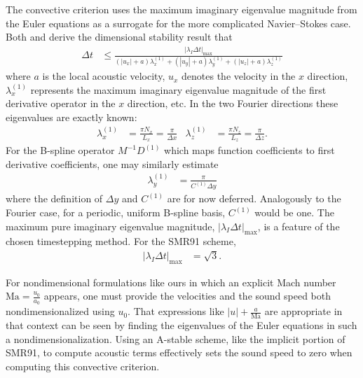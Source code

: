 \documentclass[letterpaper,11pt,nointlimits,reqno,draft]{amsbook}
\begin{document}
The convective criterion uses the maximum imaginary eigenvalue magnitude from
the Euler equations as a surrogate for the more complicated Navier--Stokes
case.  Both \citet[equation~2.39]{Kwok2002} and
\citet[equations~4.20--21]{Guarini1998} derive the dimensional stability result
that
\begin{align}\label{eq:convectivestability}
  \Delta{}t &\leq
  \frac{
    \left|\lambda_{I}\Delta{}t\right|_{\max}
  }{
      \left(\left|u_{x}\right| + a\right) \lambda^{(1)}_x
    + \left(\left|u_{y}\right| + a\right) \lambda^{(1)}_y
    + \left(\left|u_{z}\right| + a\right) \lambda^{(1)}_z
  }
\end{align}
where $a$ is the local acoustic velocity, $u_{x}$ denotes the velocity in the
$x$ direction, $\lambda^{(1)}_x$ represents the maximum imaginary eigenvalue
magnitude of the first derivative operator in the $x$ direction, etc.  In the
two Fourier directions these eigenvalues are exactly known:
\begin{align}
    \lambda^{(1)}_x &= \frac{\pi N_x}{L_x} = \frac{\pi}{\Delta{}x}
    &
    \lambda^{(1)}_z &= \frac{\pi N_z}{L_z} = \frac{\pi}{\Delta{}z}
    .
\end{align}
For the B-spline operator $M^{-1} D^{(1)}$ which maps function coefficients to
first derivative coefficients, one may similarly estimate
\begin{align}\label{eq:lambda1deltay}
    \lambda^{(1)}_y &= \frac{\pi}{C^{(1)}\Delta{}y}
\end{align}
where the definition of $\Delta{}y$ and $C^{(1)}$ are for now deferred.
Analogously to the Fourier case, for a periodic, uniform B-spline basis,
$C^{(1)}$ would be one.  The maximum pure imaginary eigenvalue magnitude,
$\left|\lambda_{I}\Delta{}t\right|_{\max}$, is a feature of the chosen
timestepping method.  For the SMR91 scheme,
\begin{align}
  \left|\lambda_{I}\Delta{}t\right|_{\max} &= \sqrt{3}.
\end{align}

For nondimensional formulations like ours in which an explicit Mach number
$\mbox{Ma}=\frac{u_0}{a_0}$ appears, one must provide the velocities and the
sound speed both nondimensionalized using $u_0$.  That expressions like
$\left|u\right| + \frac{a}{\mbox{Ma}}$ are appropriate in that context can be
seen by finding the eigenvalues of the Euler equations in such a
nondimensionalization.  Using an A-stable scheme, like the implicit portion of
SMR91, to compute acoustic terms effectively sets the sound speed to zero when
computing this convective criterion.
\end{document}
